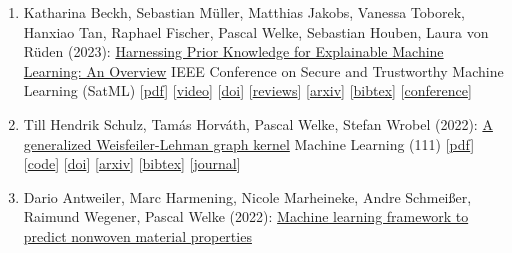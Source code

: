 \documentclass{scrartcl}
\begin{document}
\begin{enumerate}
\href{https://dx.doi.org/10.1145/3583780.3615497}{Retention Is All You Need}\newline
International Conference on Information and Knowledge Management (CIKM)\newline
{\footnotesize
[\href{https://dx.doi.org/10.1145/3583780.3615497}{doi}]
[\href{https://arxiv.org/abs/2304.03103}{arxiv}]
[\href{https://dblp.org/rec/journals/corr/abs-2304-03103.bib}{bibtex}]
[\href{https://uobevents.eventsair.com/cikm2023/}{conference}]
}
\item
\label{beckh2023harnessing}
Katharina Beckh, Sebastian Müller, Matthias Jakobs, Vanessa Toborek, Hanxiao Tan, Raphael Fischer, Pascal Welke, Sebastian Houben, Laura von Rüden (2023):\newline
\href{https://dx.doi.org/10.1109/SaTML54575.2023.00038}{Harnessing Prior Knowledge for Explainable Machine Learning: An Overview}\newline
IEEE Conference on Secure and Trustworthy Machine Learning (SatML)\newline
{\footnotesize
[\href{https://pwelke.de/publications/beckh2023harnessing.pdf}{pdf}]
[\href{https://youtu.be/deaapyAYYbQ}{video}]
[\href{https://dx.doi.org/10.1109/SaTML54575.2023.00038}{doi}]
[\href{https://openreview.net/forum?id=1KE7TlU4bOt}{reviews}]
[\href{https://arxiv.org/abs/2105.10172}{arxiv}]
[\href{https://dblp.org/rec/journals/corr/abs-2105-10172.bib}{bibtex}]
[\href{https://satml.org/}{conference}]
}
\item
\label{schulz2022mach}
Till Hendrik Schulz, Tamás Horváth, Pascal Welke, Stefan Wrobel (2022):\newline
\href{https://dx.doi.org/10.1007/s10994-022-06131-w}{A generalized Weisfeiler-Lehman graph kernel}\newline
Machine Learning (111)\newline
{\footnotesize
[\href{https://pwelke.de/publications/schulz2022mach.pdf}{pdf}]
[\href{https://github.com/mlai-bonn/GenWL}{code}]
[\href{https://dx.doi.org/10.1007/s10994-022-06131-w}{doi}]
[\href{https://arxiv.org/abs/2101.08104}{arxiv}]
[\href{https://dblp.org/rec/journals/ml/SchulzHWW22.bib}{bibtex}]
[\href{https://www.springer.com/journal/10994}{journal}]
}
\item
\label{antweiler2022softwareimpacts}
Dario Antweiler, Marc Harmening, Nicole Marheineke, Andre Schmeißer, Raimund Wegener, Pascal Welke (2022):\newline
\href{https://dx.doi.org/10.1016/j.simpa.2022.100423}{Machine learning framework to predict nonwoven material properties
}
\end{enumerate}
\end{document}
